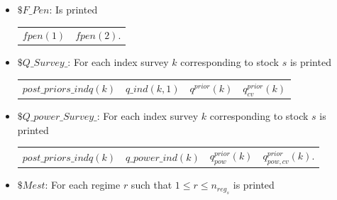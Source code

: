 \documentclass{article}
\begin{document}
\begin{itemize}
\begin{center}
\begin{tabular}{c c}
     \end{tabular}
 \end{center}

\item $\$ F\_Pen$: Is printed 
\begin{center}
\begin{tabular}{c c}
    $fpen(1)$ & $fpen(2)$. \\
     
\end{tabular}
\end{center}

\item $\$ Q\_Survey\_$: For each index survey $k$ corresponding to stock $s$ is printed 
\begin{center}
    \begin{tabular}{c c c c}
        $post\_priors\_indq(k)$ & $q\_ind(k,1)$ & $q^{prior}(k)$ & $q^{prior}_{cv}(k)$ \\
    \end{tabular}
\end{center}


\item $\$ Q\_power\_Survey\_$: For each index survey $k$ corresponding to stock $s$ is printed 
\begin{center}
    \begin{tabular}{c c c c}
        $post\_priors\_indq(k)$ & $q\_power\_ind(k)$ & $q_{pow}^{prior}(k)$ & $q_{pow,cv}^{prior}(k)$. \\
    \end{tabular}
\end{center}

\item $\$ Mest$: For each regime $r$ such that $1\leq r\leq n_{reg_s}$ is printed
\end{itemize}
\end{document}
